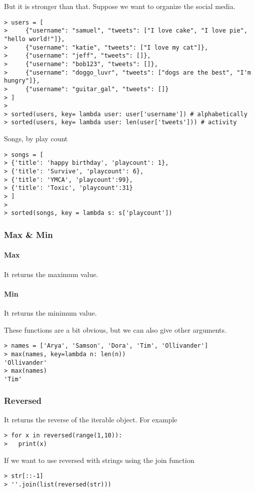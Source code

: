 But it is stronger than that. Suppose we want to organize the social media. 
\begin{verbatim}
> users = [
>     {"username": "samuel", "tweets": ["I love cake", "I love pie", "hello world!"]},
>     {"username": "katie", "tweets": ["I love my cat"]},
>     {"username": "jeff", "tweets": []},
>     {"username": "bob123", "tweets": []},
>     {"username": "doggo_luvr", "tweets": ["dogs are the best", "I'm hungry"]},
>     {"username": "guitar_gal", "tweets": []}
> ]
>
> sorted(users, key= lambda user: user['username']) # alphabetically
> sorted(users, key= lambda user: len(user['tweets'])) # activity
\end{verbatim}

Songs, by play count
\begin{verbatim}
> songs = [
> {'title': 'happy birthday', 'playcount': 1},
> {'title': 'Survive', 'playcount': 6},
> {'title': 'YMCA', 'playcount':99},
> {'title': 'Toxic', 'playcount':31}
> ]
>
> sorted(songs, key = lambda s: s['playcount'])
\end{verbatim}

\subsubsection{Max \& Min}

\paragraph{Max} It returns the maximum value.

\paragraph{Min} It returns the minimum value.

These functions are a bit obvious, but we can also give other arguments. 
\begin{verbatim}
> names = ['Arya', 'Samson', 'Dora', 'Tim', 'Ollivander']
> max(names, key=lambda n: len(n))
'Ollivander'
> max(names)
'Tim'
\end{verbatim}

\subsubsection{Reversed}

It returns the reverse of the iterable object. For example
\begin{verbatim}
> for x in reversed(range(1,10)):
>	print(x)
\end{verbatim}
If we want to use reversed with strings using the join function
\begin{verbatim}
> str[::-1]
> ''.join(list(reversed(str)))
\end{verbatim}

